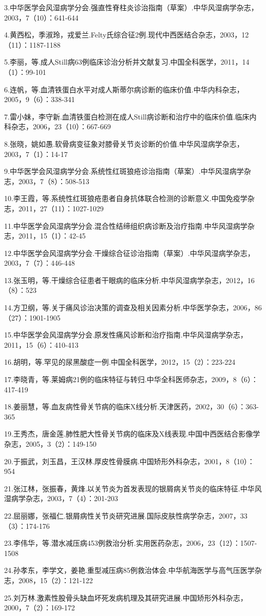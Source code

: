3.中华医学会风湿病学分会.强直性脊柱炎诊治指南（草案）.中华风湿病学杂志，2003，7（10）：641-644

4.黄西松，季淑玲，戎爱兰.Felty氏综合征2例.现代中西医结合杂志，2003，12（11）：1187-1188

5.李丽，等.成人Still病63例临床诊治分析并文献复习.中国全科医学，2011，14（1）：99-101

6.连帆，等.血清铁蛋白水平对成人斯蒂尔病诊断的临床价值.中华内科杂志，2005，9（6）：338-341

7.雷小妹，李守新.血清铁蛋白检测在成人Still病诊断和治疗中的临床价值.临床内科杂志，2006，23（10）：667-669

8.张晓，姚如愚.软骨病变征象对膝骨关节炎诊断的价值.中华风湿病学杂志，2003，7（1）：14-17

9.中华医学会风湿病学分会.系统性红斑狼疮诊治指南（草案）.中华风湿病学杂志，2003，7（8）：508-513

10.李王霞，等.系统性红斑狼疮患者自身抗体联合检测的诊断意义.中国免疫学杂志，2011，27（11）：1027-1029

11.中华医学会风湿病学分会.混合性结缔组织病诊断及治疗指南.中华风湿病学杂志，2011，15（1）：42-45

12.中华医学会风湿病学分会.干燥综合征诊治指南（草案）.中华风湿病学杂志，2003，7（7）：446-448

13.张玉明，等.干燥综合征患者干眼病的临床分析.中华风湿病学杂志，2012，16（8）：523

14.方卫纲，等.关于痛风诊治决策的调查及相关因素分析.中华医学杂志，2006，86（27）：1901-1905

15.中华医学会风湿病学分会.原发性痛风诊断和治疗指南.中华风湿病学杂志，2011，15（6）：410-413

16.胡明，等.罕见的尿黑酸症一例.中国全科医学，2012，15（2）：223-224

17.李晓青，等.莱姆病21例的临床特征与转归.中华全科医师杂志，2009，8（6）：417-419

18.姜丽慧，等.血友病性骨关节病的临床X线分析.天津医药，2002，30（6）：363-365

19.王秀杰，唐金莲.肺性肥大性骨关节病的临床及X线表现.中国中西医结合影像学杂志，2005，3（2）：149-150

20.于振武，刘玉昌，王汉林.厚皮性骨膜病.中国矫形外科杂志，2001，8（10）：954

21.张江林，张振春，黄烽.以关节炎为首发表现的银屑病关节炎的临床特征.中华风湿病学杂志，2003，7（4）：201-203

22.屈丽娜，张福仁.银屑病性关节炎研究进展.国际皮肤性病学杂志，2007，33（3）：174-176

23.李伟华，等.潜水减压病453例救治分析.实用医药杂志，2006，23（12）：1507-1508

24.孙孝东，李学文，姜艳.重型减压病85例救治体会.中华航海医学与高气压医学杂志，2008，15（2）：121-122

25.刘万林.激素性股骨头缺血坏死发病机理及其研究进展.中国矫形外科杂志，2000，7（2）：169-172

\protect\hypertarget{text00332.html}{}{}

